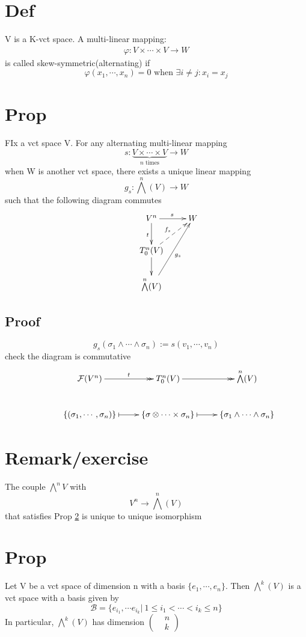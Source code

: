 \documentclass{book}
\begin{document}
\section{Def}
V is a K-vct space. A multi-linear mapping:
$$\begin{aligned}
    \varphi:V\times\cdots\times V\rightarrow W
\end{aligned}$$
is called skew-symmetric(alternating) if
$$\varphi(x_1,\cdots,x_n)=0\text{ when }\exists i\neq j:x_i=x_j$$
\section{Prop}
\label{VIII-46.8}
FIx a vct space V. For any alternating multi-linear mapping
$$s:\underbrace{V\times\cdots\times V}\limits_{n\text{ times}}\rightarrow W$$
when W is another vct space, there exists a unique linear mapping$$g_s:\bigwedge\limits^n(V)\rightarrow W$$
such that the following diagram commutes
$$\xymatrix{
    & V^n\ar[d]_t\ar[r]^s & W\\
    &T^n_0(V)\ar@{-->}[ur]^{f_s}\ar[d] &\\
    & \bigwedge\limits^n(V)\ar[uur]_{g_s}
}$$
\subsection*{Proof}
$$g_s(\sigma_1\wedge\cdots\wedge\sigma_n):=s(v_1,\cdots,v_n)$$
check the diagram is commutative
$$\xymatrix{
    &\mathcal{F}(V^n)\ar@{->>}[r]^t &T^n_0(V)\ar@{->>}[r]&\bigwedge\limits^n(V)\\
    &\{(\sigma_1,\cdots,\sigma_n)\}\ar@{|->}[r]&\{\sigma\otimes\cdots\times\sigma_n\}\ar@{|->}[r]&\{\sigma_1\wedge\cdots\wedge\sigma_n\}
}$$
\section{Remark/exercise}
The couple $\bigwedge\limits^nV$ with
$$V^n\rightarrow\bigwedge\limits^n(V)$$
that satisfies Prop \ref{VIII-46.8} is unique to unique isomorphism
\section{Prop}
Let V be a vct space of dimension n with a basis $\{e_1,\cdots,e_n\}$. Then $\bigwedge\limits^k(V)$ is a vct space with a basis given by $$\mathcal{B}=\{e_{i_1},\cdots e_{i_k}\big|\ 1\leq i_1<\cdots<i_k\leq n\}$$
In particular, $\bigwedge\limits^k(V)$ has dimension $\left(\begin{aligned}
    &n \\ &k
\end{aligned}
\right)$
\end{document}
